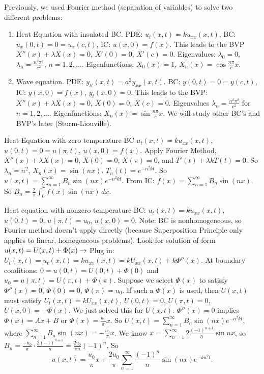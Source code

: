 \documentclass[]{article}
\begin{document}
Previously, we used Fourier method (separation of variables) to solve two different problems: 
\begin{enumerate}
	\item Heat Equation with insulated BC. PDE: $u_t(x,t) = ku_{xx} (x,t)$, BC: $u_x(0,t) = 0 = u_x(c,t)$, IC: $u(x,0) = f(x)$. This leads to the BVP $X''(x) + \lambda X(x) = 0$, $X'(0)=0$, $X'(c)=0$. Eigenvalues: $\lambda_0 = 0$, $\lambda_n = \frac{n^2\pi^2}{c^2}$, $n=1,2,\dots$. Eigenfunctions: $X_0(x) = 1$, $X_n(x) = \cos{\frac{n\pi}{c}x}$.
	\item Wave equation. PDE: $y_{tt}(x,t)=a^2y_{xx}(x,t)$. BC: $y(0,t)=0 = y(c,t)$, IC: $y(x,0)=f(x)$, $y_t(x,0)=0$. This leads to the BVP: $X''(x) + \lambda X(x)=0$, $X(0)=0$, $X(c)=0$. Eigenvalues $\lambda_n = \frac{n^2\pi^2}{c^2}$ for $n=1,2,\dots$. Eigenfunctions: $X_n(x) = \sin{\frac{n\pi}{c}x}$. We will study other BC's and BVP's later (Sturm-Liouville).
\end{enumerate}
\begin{example}
	Heat Equation with zero temperature BC $u_t(x,t)=ku_{xx}(x,t)$, $u(0,t)=0=u(\pi,t)$, $u(x,0)=f(x)$.
	Apply Fourier Method, $X''(x) + \lambda X(x) = 0$, $X(0)=0$, $X(\pi) = 0$, and $T'(t) + \lambda k T(t) = 0$. So $\lambda_n = n^2$, $X_n(x) = \sin{(nx)}$. $T_n(t) = e^{-n^2kt}$. So $u(x,t) = \sum_{n=1}^\infty B_n \sin{(nx)} e^{-n^2kt}$. From IC: $f(x) = \sum_{n=1}^\infty B_n \sin{(nx)}$. So $B_n = \frac{2}{\pi} \int_0^\pi f(x) \sin{(nx)} \, dx$.
\end{example}
\begin{example}
	Heat equation with nonzero temperature BC: $u_t(x,t) = ku_{xx}(x,t)$, $u(0,t) = 0$, $u(\pi,t) = u_0$, $u(x,0) = 0$.
	Note: BC is nonhomogeneous, so Fourier method doesn't apply directly (because Superposition Principle only applies to linear, homogeneous problems).
	Look for solution of form $u(x,t) = U(x,t) + \Phi(x) \rightarrow$ Plug in: $U_t(x,t) = u_t(x,t) = ku_{xx}(x,t) = k U_{xx}(x,t) + k \Phi''(x)$. At boundary conditions: $0=u(0,t) = U(0,t) + \Phi(0)$ and $u_0 = u(\pi,t) = U(\pi, t) + \Phi(\pi)$. Suppose we select $\Phi(x)$ to satisfy $\Phi''(x) = 0$, $\Phi(0) = 0$, $\Phi(\pi) = u_0$. If such a $\Phi(x)$ is used, then $U(x,t)$ must satisfy $U_t(x,t) = kU_{xx}(x,t)$, $U(0,t)=0$, $U(\pi,t) = 0$, $U(x,0) = -\Phi(x)$. We just solved this for $U(x,t)$. $\Phi''(x) = 0$ implies $\Phi(x) = Ax+B$ or $\Phi(x) = \frac{u_0}{\pi}x$. So $U(x,t) = \sum_{n=1}^\infty B_n \sin{(nx)}e^{-n^2kt}$, where $\sum_{n=1}^\infty B_n \sin{(nx)} = -\frac{u_0}{\pi}x$.
	We know $x = \sum_{n=1}^\infty 2\frac{(-1)^{n+1}}{n}\sin{nx}$, so $B_n = \frac{-u_0}{\pi} \cdot \frac{2(-1)^{n+1}}{n} = \frac{2u_0}{\pi n}(-1)^n$. So $$u(x,t) = \frac{u_0}{\pi}x + \frac{2u_0}{\pi} \sum_{n=1}^\infty \frac{(-1)^n}{n} \sin{(nx)}e^{-kn^2t}.$$
\end{example}
\end{document}

